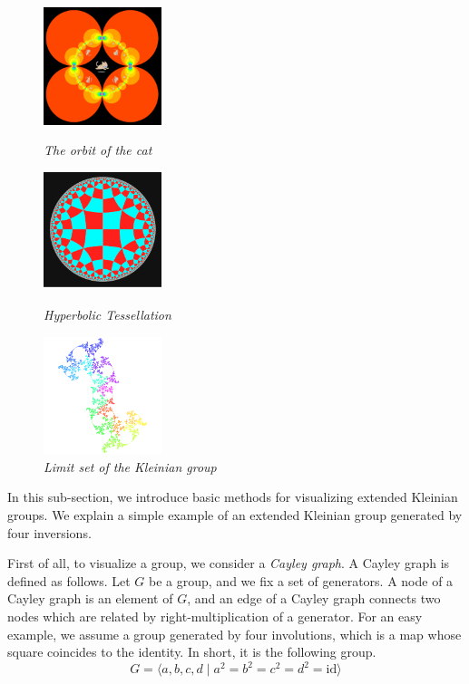 \begin{figure}[htbp]
 \begin{minipage}[t]{0.3333\hsize}
  \center
  \includegraphics[height=1.35in, keepaspectratio]{img/preparation/basic/catCircleOrbit.png}
  \caption{\textit{The orbit of the cat}}
  \label{fig:orbitCat}
  \hspace*{\fill}
 \end{minipage}
 \begin{minipage}[t]{0.3333\hsize}
  \center
  \includegraphics[height=1.35in, keepaspectratio]{img/preparation/basic/hyperbolicTessellation.png}
  \caption{\textit{Hyperbolic Tessellation}}
  \label{fig:hypTiling}
  \hspace*{\fill}
 \end{minipage}
 \begin{minipage}[t]{0.3333\hsize}
  \center
  \includegraphics[height=1.35in, keepaspectratio]{img/preparation/limitSet/limit.png}
  \caption{\textit{Limit set of the Kleinian group}}
  \label{fig:limit}
  \hspace*{\fill}
 \end{minipage}
\end{figure}

\noindent In this sub-section, we introduce basic methods for
visualizing extended Kleinian groups.
We explain a simple example of an extended Kleinian group generated by
four inversions.

First of all, to visualize a group, we consider a \textit{Cayley graph}.
A Cayley graph is defined as follows. Let $G$ be a group, and we fix a
set of generators.
A node of a Cayley graph is an element of $G$, and an edge of a Cayley
graph connects two nodes which are related by right-multiplication of a
generator.
For an easy example, we assume a group generated by four
involutions, which is a map whose square coincides to the identity.
In short, it is the following group.
\[ G=\langle a,b,c,d \mid a^2=b^2=c^2=d^2 = \mathrm{id} \rangle \]

